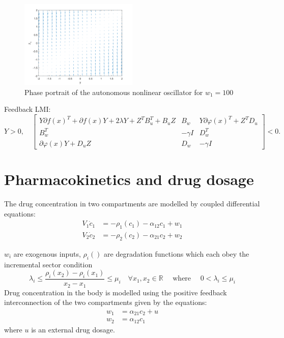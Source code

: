 \documentclass{article}
\begin{document}
\begin{figure}[H]
    \centering
    \includegraphics[width=0.5\textwidth]{figures/oscillator_phase_portrait.png}
    \caption{Phase portrait of the autonomous nonlinear oscillator for $w_1 = 100$}
    \label{fig:phase_portrait_w100}
\end{figure}

Feedback LMI:
\begin{equation}
    Y > 0, \quad
    \left[
    \begin{array}{ccc}
    Y \partial f(x)^T + \partial f(x) Y + 2\lambda Y + Z^T B_u^T + B_u Z & B_w & Y \partial \varphi(x)^T + Z^T D_u \\
    B_w^T & -\gamma I & D_w^T \\
    \partial \varphi(x) Y + D_u Z & D_w & -\gamma I
    \end{array}
    \right] < 0.
\end{equation}

\section{Pharmacokinetics and drug dosage}

The drug concentration in two compartments are modelled by coupled differential equations:
\begin{align}
    V_1 \dot{c}_1 &= - \rho_1(c_1) - \alpha_{12}c_1 + w_1 \\
    V_2 \dot{c}_2 &= - \rho_2(c_2) - \alpha_{21}c_2 + w_2
\end{align}

$w_i$ are exogenous inputs, $\rho_i()$ are degradation functions which each obey the incremental sector condition
\begin{equation}
    \lambda_i \leq \frac{\rho_i(x_2) - \rho_i(x_1)}{x_2 - x_1} \leq \mu_i \quad \forall x_1, x_2 \in \mathbb{R} \quad \text{ where } \quad 0 < \lambda_i \leq \mu_i
\end{equation}
Drug concentration in the body is modelled using the positive feedback interconnection of the two compartments given by the equations:
\begin{align}
    w_1 &= \alpha_{21} c_2 + u \\
    w_2 &= \alpha_{12} c_1
\end{align}
where $u$ is an external drug dosage.
\end{document}
